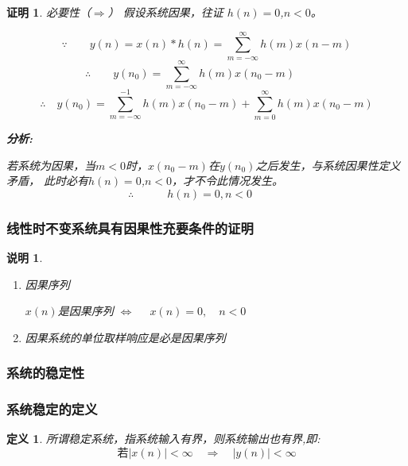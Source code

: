 \documentclass[notheorems,compress,mathserif,table]{beamer}
\newtheorem{definition}{定义}
\newtheorem{daproof}{证明}
\newtheorem{shuoming}{说明}
\begin{document}
\begin{frame}[shrink]\frametitle{}
 \begin{daproof}
必要性（$\Rightarrow$） 假设系统因果，往证 $h(n)=0$,$n<0$。

  $$\because\qquad  %
        y(n) = x(n) * h(n)%
                =\sum_{m=-\infty}^{\infty}h(m)x(n-m) $$%
        $$\therefore \qquad y(n_{0}) = \sum_{m=-\infty}^{\infty}h(m)x(n_{0}-m)\quad\quad\quad$$
        $$\therefore \quad y(n_{0}) = \sum_{m=-\infty}^{-1}h(m)x(n_{0}-m) + \sum_{m=0}^{\infty}h(m)x(n_{0}-m)$$

        \par \textbf{分析:}
        \par 若系统为因果，当$m<0$时，$x(n_0-m)$在$y(n_0)$之后发生，与系统因果性定义矛盾，
        此时必有$h(n)=0$,$n<0$，才不令此情况发生。
        $$\therefore \quad\quad\quad h(n)=0,n<0\quad\quad\quad$$

\end{daproof}

\end{frame}
\begin{frame}[shrink]\frametitle{线性时不变系统具有因果性充要条件的证明}%


\begin{shuoming}
\begin{enumerate}
     \item 因果序列 \par
           \begin{center}
           $x(n)$是因果序列  $\Longleftrightarrow$ $\quad x(n) =0,\quad n<0 $
           \end{center}
     \item 因果系统的单位取样响应是必是因果序列
\end{enumerate}
\end{shuoming}



\end{frame}

\subsubsection*{系统的稳定性}
\begin{frame}[shrink]\frametitle{系统稳定的定义}%
\begin{definition}

        所谓稳定系统，指系统输入有界，则系统输出也有界,即:
        \begin{equation*}
          \mbox{若}|x(n)|< \infty\quad\Longrightarrow\quad |y(n)|<\infty
        \end{equation*}
\end{definition}
\end{frame}
\end{document}
